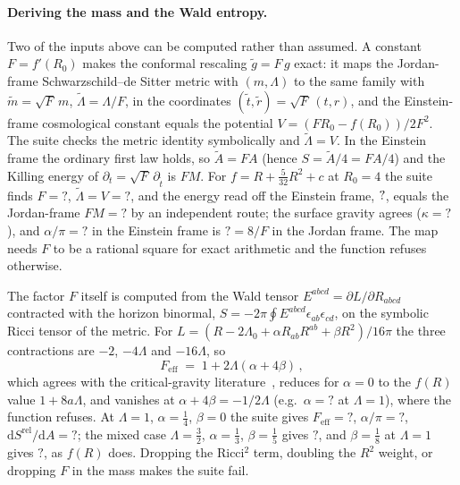 \documentclass[11pt,a4paper]{article}
\newcommand{\NFFREFF}{?}\newcommand{\NFFREFLambdaTilde}{?}
\newcommand{\NFFREFFM}{?}\newcommand{\NFFREFAlpha}{?}
\newcommand{\NFFREFAlphaEinstein}{?}\newcommand{\NFFREFKappa}{?}
\newcommand{\NFFRQGF}{?}\newcommand{\NFFRQGAlpha}{?}
\newcommand{\NFFRQGSrel}{?}\newcommand{\NFFRQGMixedF}{?}
\newcommand{\NFFRQGBetaF}{?}\newcommand{\NFFRQGCritical}{?}
\newcommand{\Srel}{S^{\mathrm{rel}}}
\newcommand{\dd}{\mathrm{d}}
\theoremstyle{plain}
\theoremstyle{definition}
\begin{document}
\paragraph{Deriving the mass and the Wald entropy.}
Two of the inputs above can be computed rather than assumed. A constant
$F = f'(R_0)$ makes the conformal rescaling $\tilde g = F\,g$ exact: it maps
the Jordan-frame Schwarzschild--de Sitter metric with $(m,\Lambda)$ to the
same family with $\tilde m = \sqrt F\,m$, $\tilde\Lambda = \Lambda/F$, in the
coordinates $(\tilde t,\tilde r) = \sqrt F\,(t,r)$, and the Einstein-frame
cosmological constant equals the potential $V = (F R_0 - f(R_0))/2F^2$. The
suite checks the metric identity symbolically and $\tilde\Lambda = V$. In the
Einstein frame the ordinary first law holds, so $\tilde A = F A$ (hence $S =
\tilde A/4 = FA/4$) and the Killing energy of $\partial_t = \sqrt F\,
\partial_{\tilde t}$ is $F M$. For $f = R + \tfrac{5}{32}R^2 + c$ at $R_0 = 4$ the
suite finds $F = \NFFREFF$, $\tilde\Lambda = V = \NFFREFLambdaTilde$, and the
energy read off the Einstein frame, $?$, equals the Jordan-frame
$F M = \NFFREFFM$ by an independent route; the surface gravity agrees
($\kappa = \NFFREFKappa$), and $\alpha/\pi = \NFFREFAlphaEinstein$ in the Einstein
frame is $\NFFREFAlpha = 8/F$ in the Jordan frame. The map needs $F$ to be a
rational square for exact arithmetic and the function refuses otherwise.

The factor $F$ itself is computed from the Wald tensor $E^{abcd} =
\partial L/\partial R_{abcd}$ contracted with the horizon binormal,
$S = -2\pi\oint E^{abcd}\epsilon_{ab}\epsilon_{cd}$, on the symbolic
Ricci tensor of the metric. For $L = (R - 2\Lambda_0 + \alpha R_{ab}R^{ab} +
\beta R^2)/16\pi$ the three contractions are $-2$, $-4\Lambda$ and $-16\Lambda$,
so
\begin{equation}
F_{\mathrm{eff}} \;=\; 1 + 2\Lambda(\alpha + 4\beta)\,,
\label{eq:feff}
\end{equation}
which agrees with the critical-gravity literature~\cite{LuPope2011}, reduces
for $\alpha = 0$ to the $f(R)$ value $1 + 8a\Lambda$, and vanishes at
$\alpha + 4\beta = -1/2\Lambda$ (e.g.\ $\alpha = \NFFRQGCritical$ at $\Lambda =
1$), where the function refuses. At $\Lambda = 1$, $\alpha = \tfrac14$,
$\beta = 0$ the suite gives $F_{\mathrm{eff}} = \NFFRQGF$, $\alpha/\pi =
\NFFRQGAlpha$, $\dd\Srel/\dd A = \NFFRQGSrel$; the mixed case $\Lambda =
\tfrac32$, $\alpha = \tfrac13$, $\beta = \tfrac15$ gives $\NFFRQGMixedF$, and
$\beta = \tfrac18$ at $\Lambda = 1$ gives $\NFFRQGBetaF$, as $f(R)$ does. Dropping
the Ricci$^2$ term, doubling the $R^2$ weight, or dropping $F$ in the mass makes
the suite fail.
\end{document}
